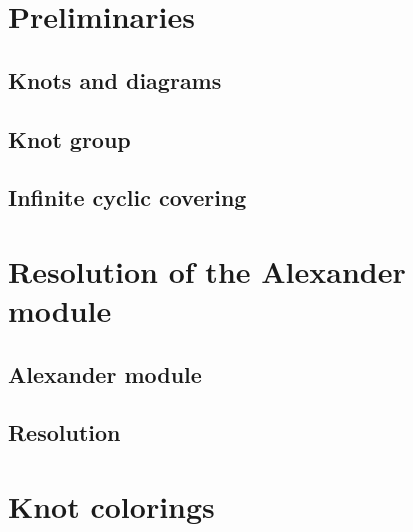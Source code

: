 \documentclass[14pt]{extarticle} %
\begin{document}
\newpage

\section{Preliminaries}

\subsection{Knots and diagrams}



\subsection{Knot group}



\subsection{Infinite cyclic covering}



\section{Resolution of the Alexander module}
\label{section2}

\subsection{Alexander module}
\label{alexander module discussion}



\subsection{Resolution}



\section{Knot colorings}




%

\end{document}
